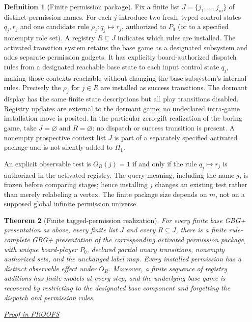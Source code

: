 \documentclass[11pt,letterpaper]{article}
\newtheorem{theorem}{Theorem}[section]
\theoremstyle{definition}\newtheorem{definition}[theorem]{Definition}\newtheorem{example}[theorem]{Example}
\theoremstyle{remark}\newtheorem{remark}[theorem]{Remark}
\newcommand{\prooflink}[1]{\par\noindent\hfill\small\hyperref[#1]{\textit{Proof in PROOFS}}\normalsize}
\begin{document}
\begin{definition}[Finite permission package]\label{w1:def:permission}
Fix a finite list $J=\{j_1,\ldots,j_m\}$ of distinct permission names. For each $j$ introduce two fresh, typed control states $q_j,r_j$ and one candidate rule $\rho_j:q_j\mapsto r_j$, authorized to $P_0$ (or to a specified nonempty role set). A registry $R\subseteq J$ indicates which rules are installed. The activated transition system retains the base game as a designated
subsystem and adds separate permission gadgets. It has explicitly
board-authorized dispatch rules from a designated reachable base state to
each input control state $q_j$, making those contexts reachable without
changing the base subsystem's internal rules. Precisely the $\rho_j$ for
$j\in R$ are installed as success transitions. The dormant display has the same finite state descriptions but all play transitions disabled. Registry updates are external to the dormant game; no undeclared intra-game installation move is posited. In the particular zero-gift realization of the boring game, take $J=\varnothing$ and $R=\varnothing$: no dispatch or success transition is present. A nonempty prospective context list $J$ is part of a separately specified activated package and is not silently added to $H_1$.
\end{definition}

An explicit observable test is $O_R(j)=1$ if and only if the rule $q_j\mapsto r_j$ is authorized in the activated registry. The query meaning, including the name $j$, is frozen before comparing stages; hence installing $j$ changes an existing test rather than merely relabeling a vertex. The finite package size depends on $m$, not on a supposed global infinite permission universe.

\begin{theorem}[Finite tagged-permission realization]\label{w1:th:finite}
For every finite base GBG+ presentation as above, every finite list $J$ and every $R\subseteq J$, there is a finite rule-complete GBG+ presentation of the corresponding activated permission package, with unique board-player $P_0$, declared partial unary transitions, nonempty authorized sets, and the unchanged label map. Every installed permission has a distinct observable effect under $O_R$. Moreover, a finite sequence of registry additions has finite models at every step, and the underlying base game is recovered by restricting to the designated base component and forgetting the dispatch and permission rules.
\prooflink{w1:pr:finite}
\end{theorem}
\end{document}
